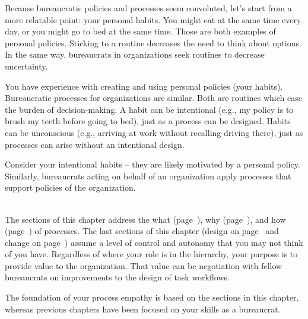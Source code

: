 
Because bureaucratic policies and processes seem convoluted, let's start from a more relatable point: your personal habits.
You might eat at the same time every day, or you might go to bed at the same time. Those are both examples of personal policies. Sticking to a routine decreases the need to think about options. In the same way, bureaucrats in organizations seek routines to decrease uncertainty. 

You have experience with creating and using personal policies (your habits).  Bureaucratic processes for organizations are similar.
Both are routines which ease the burden of decision-making. A habit can be intentional (e.g., my policy is to brush my teeth before going to bed), just as a process can be designed. Habits can be unconscious (e.g., arriving at work without recalling driving there), just as processes can arise without an intentional design. 

Consider your intentional habits -- they are likely motivated by a personal policy. Similarly, bureaucrats acting on behalf of an organization apply processes that support policies of the organization.

\ \\

The sections of this chapter address the what (page~\pageref{sec:definition-of-process}), why (page~\pageref{sec:why-processes-exist}), and how (page~\pageref{sec:process-chaos}) of processes. 
The last sections of this chapter (design on page~\pageref{sec:design-of-processes} and change on page~\pageref{sec:change-a-process}) assume a level of control and autonomy that you may not think of you have. Regardless of where your role is in the hierarchy, your purpose is to provide value to the organization. That value can be negotiation with fellow bureaucrats on improvements to the design of task workflows. 

The foundation of your \gls{process empathy} is based on the sections in this chapter, whereas previous chapters have been focused on your skills as a bureaucrat. 
